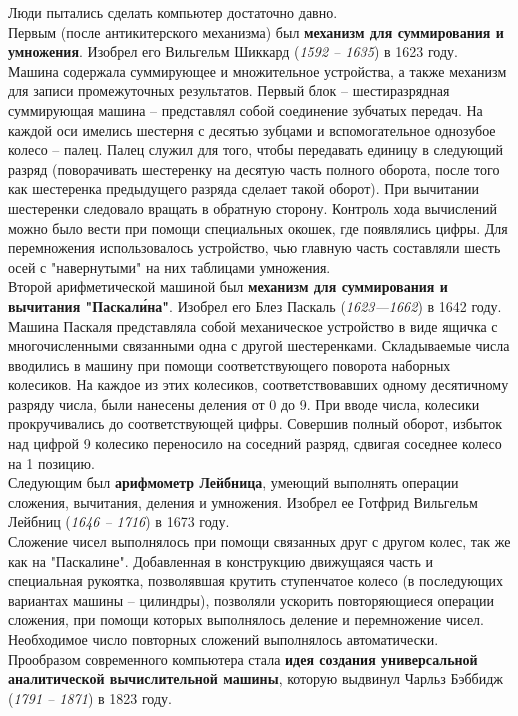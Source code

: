 Люди пытались сделать компьютер достаточно давно.
\\Первым (после антикитерского механизма) был \textbf{механизм для суммирования и умножения}. Изобрел его Вильгельм Шиккард (\emph{1592 -- 1635}) в 1623 году.
\\Машина содержала суммирующее и множительное устройства, а также механизм для записи промежуточных результатов. Первый блок -- шестиразрядная суммирующая машина -- представлял собой соединение зубчатых передач. На каждой оси имелись шестерня с десятью зубцами и вспомогательное однозубое колесо -- палец. Палец служил для того, чтобы передавать единицу в следующий разряд (поворачивать шестеренку на десятую часть полного оборота, после того как шестеренка предыдущего разряда сделает такой оборот). При вычитании шестеренки следовало вращать в обратную сторону. Контроль хода вычислений можно было вести при помощи специальных окошек, где появлялись цифры. Для перемножения использовалось устройство, чью главную часть составляли шесть осей с "навернутыми" на них таблицами умножения.
\\Второй арифметической машиной был \textbf{механизм для суммирования и вычитания "Паскал\'ина"}. Изобрел его Блез Паскаль (\emph{1623—1662}) в 1642 году.
\\Машина Паскаля представляла собой механическое устройство в виде ящичка с многочисленными связанными одна с другой шестеренками. Складываемые числа вводились в машину при помощи соответствующего поворота наборных колесиков. На каждое из этих колесиков, соответствовавших одному десятичному разряду числа, были нанесены деления от 0 до 9. При вводе числа, колесики прокручивались до соответствующей цифры. Совершив полный оборот, избыток над цифрой 9 колесико переносило на соседний разряд, сдвигая соседнее колесо на 1 позицию.
\\Следующим был \textbf{арифмометр Лейбница}, умеющий выполнять операции сложения, вычитания, деления и умножения. Изобрел ее Готфрид Вильгельм Лейбниц (\emph{1646 -- 1716}) в 1673 году.
\\Сложение чисел выполнялось при помощи связанных друг с другом колес, так же как на "Паскалине". Добавленная в конструкцию движущаяся часть и специальная рукоятка, позволявшая крутить ступенчатое колесо (в последующих вариантах машины -- цилиндры), позволяли ускорить повторяющиеся операции сложения, при помощи которых выполнялось деление и перемножение чисел. Необходимое число повторных сложений выполнялось автоматически.
\\Прообразом современного компьютера стала \textbf{идея создания универсальной аналитической вычислительной машины}, которую выдвинул Чарльз Бэббидж (\emph{1791 -- 1871}) в 1823 году.
